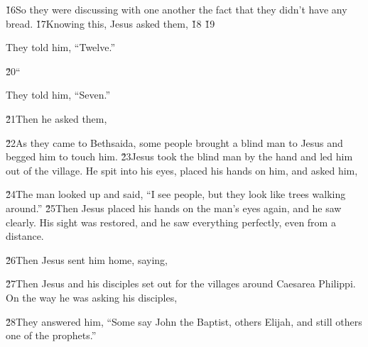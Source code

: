 \v{16}So they were discussing with one another the fact that they didn't have any bread. \v{17}Knowing this, Jesus asked them,  \v{18} \v{19}

They told him, ``Twelve.''

\v{20}``

They told him, ``Seven.''

\v{21}Then he asked them, 

\v{22}As they came to Bethsaida, some people brought a blind man to Jesus and begged him to touch him. \v{23}Jesus took the blind man by the hand and led him out of the village. He spit into his eyes, placed his hands on him, and asked him, 

\v{24}The man looked up and said, ``I see people, but they look like trees walking around.'' \v{25}Then Jesus placed his hands on the man's eyes again, and he saw clearly. His sight was restored, and he saw everything perfectly, even from a distance.

\v{26}Then Jesus sent him home, saying, 

\v{27}Then Jesus and his disciples set out for the villages around Caesarea Philippi. On the way he was asking his disciples, 

\v{28}They answered him, ``Some say John the Baptist, others Elijah, and still others one of the prophets.''

